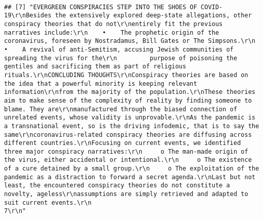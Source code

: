 \documentclass[
]{book}
\begin{document}
\begin{verbatim}
                                                                                                                                                                                                                                                                                                                                                                                                                                                                                                                                                                                                                                                                                                                                                                                                                                                                                         
## [7] "EVERGREEN CONSPIRACIES STEP INTO THE SHOES OF COVID-19\r\nBesides the extensively explored deep-state allegations, other conspiracy theories that do not\r\nentirely fit the previous narratives include:\r\n    •    The prophetic origin of the coronavirus, foreseen by Nostradamus, Bill Gates or The Simpsons.\r\n    •    A revival of anti-Semitism, accusing Jewish communities of spreading the virus for the\r\n         purpose of poisoning the gentiles and sacrificing them as part of religious rituals.\r\nCONCLUDING THOUGHTS\r\nConspiracy theories are based on the idea that a powerful minority is keeping relevant information\r\nfrom the majority of the population.\r\nThese theories aim to make sense of the complexity of reality by finding someone to blame. They are\r\nmanufactured through the biased connection of unrelated events, whose validity is unprovable.\r\nAs the pandemic is a transnational event, so is the driving infodemic, that is to say the same\r\ncoronavirus-related conspiracy theories are diffusing across different countries.\r\nFocusing on current events, we identified three major conspiracy narratives:\r\n     o The man-made origin of the virus, either accidental or intentional.\r\n     o The existence of a cure detained by a small group.\r\n     o The exploitation of the pandemic as a distraction to forward a secret agenda.\r\nLast but not least, the encountered conspiracy theories do not constitute a novelty, ageless\r\nassumptions are simply retrieved and adapted to suit current events.\r\n                                                                                                    7\r\n"                                                                                                                                                                                                                                                                                                                                                                                                                                                                                                                                                                                                                                                                                                                                                                                                                                                 
\end{verbatim}
\end{document}
